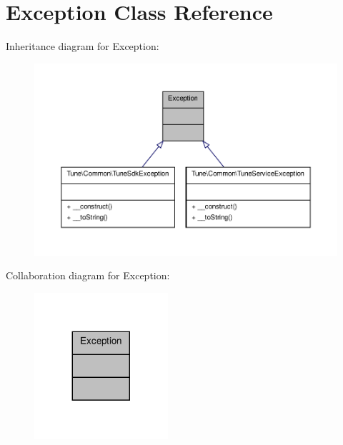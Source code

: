 \hypertarget{classException}{\section{Exception Class Reference}
\label{classException}
}


Inheritance diagram for Exception\-:
\nopagebreak
\begin{figure}[H]
\begin{center}
\leavevmode
\includegraphics[width=350pt]{classException__inherit__graph}
\end{center}
\end{figure}


Collaboration diagram for Exception\-:
\nopagebreak
\begin{figure}[H]
\begin{center}
\leavevmode
\includegraphics[width=140pt]{classException__coll__graph}
\end{center}
\end{figure}


